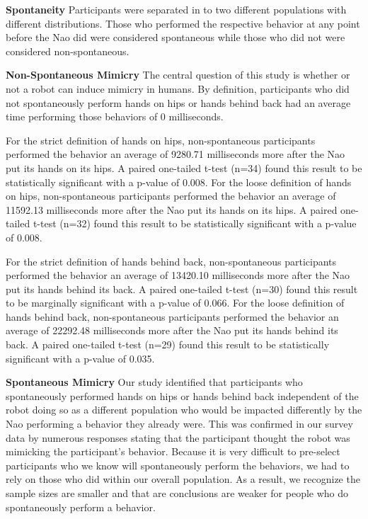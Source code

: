 \documentclass{acm_proc_article-sp}
\begin{document}
\textbf{Spontaneity} Participants were separated in to two different populations with different distributions. Those who performed the respective behavior at any point before the Nao did were considered spontaneous while those who did not were considered non-spontaneous.

\textbf{Non-Spontaneous Mimicry} The central question of this study is whether or not a robot can induce mimicry in humans. By definition, participants who did not spontaneously perform hands on hips or hands behind back had an average time performing those behaviors of 0 milliseconds. 

For the strict definition of hands on hips, non-spontaneous participants performed the behavior an average of 9280.71 milliseconds more after the Nao put its hands on its hips. A paired one-tailed t-test (n=34) found this result to be statistically significant with a p-value of 0.008. For the loose definition of hands on hips, non-spontaneous participants performed the behavior an average of 11592.13 milliseconds more after the Nao put its hands on its hips. A paired one-tailed t-test (n=32) found this result to be statistically significant with a p-value of 0.008. 

For the strict definition of hands behind back, non-spontaneous participants performed the behavior an average of 13420.10 milliseconds more after the Nao put its hands behind its back. A paired one-tailed t-test (n=30) found this result to be marginally significant with a p-value of 0.066. For the loose definition of hands behind back, non-spontaneous participants performed the behavior an average of 22292.48 milliseconds more after the Nao put its hands behind its back. A paired one-tailed t-test (n=29) found this result to be statistically significant with a p-value of 0.035.

\textbf{Spontaneous Mimicry} Our study identified that participants who spontaneously performed hands on hips or hands behind back independent of the robot doing so as a different population who would be impacted differently by the Nao performing a behavior they already were. This was confirmed in our survey data by numerous responses stating that the participant thought the robot was mimicking the participant's behavior. Because it is very difficult to pre-select participants who we know will spontaneously perform the behaviors, we had to rely on those who did within our overall population. As a result, we recognize the sample sizes are smaller and that are conclusions are weaker for people who do spontaneously perform a behavior.
\end{document}
